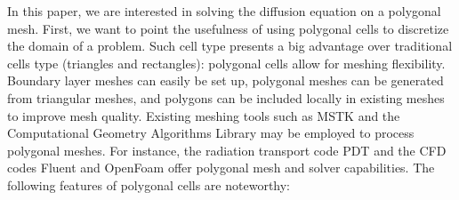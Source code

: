 In this paper, we are interested in solving the diffusion equation on a
polygonal mesh. First, we want to point the usefulness of using polygonal
cells to discretize the domain of a problem. Such cell type presents a big 
advantage over traditional cells type (triangles and rectangles): polygonal 
cells allow for meshing flexibility. Boundary layer meshes can easily be set 
up, polygonal meshes can be generated from triangular meshes, and polygons 
can be included locally in existing meshes to improve mesh quality. Existing 
meshing tools such as MSTK \cite{mstk} and the Computational Geometry Algorithms 
Library \cite{cgal} may be employed to process polygonal meshes. For 
instance, the radiation transport code PDT and the CFD codes Fluent and OpenFoam 
offer polygonal mesh and solver capabilities. The following features of polygonal
cells are noteworthy:
